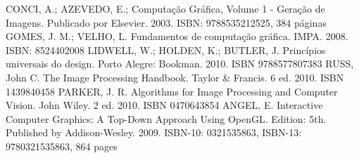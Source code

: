 {CONCI, A.; AZEVEDO, E.; Computação Gráfica, Volume 1 - Geração de
Imagens. Publicado por Elsevier. 2003. ISBN: 9788535212525, 384 páginas
\newline \newline 
GOMES, J. M.; VELHO, L. Fundamentos de computação gráfica. IMPA. 2008.
ISBN: 8524402008
\newline \newline 
LIDWELL, W.; HOLDEN, K.; BUTLER, J. Princípios universais do design. Porto
Alegre: Bookman. 2010. ISBN 9788577807383
\newline \newline 
RUSS, John C. The Image Processing Handbook. Taylor \& Francis. 6 ed.
2010. ISBN 1439840458
\newline \newline 
PARKER, J. R. Algorithms for Image Processing and Computer Vision. John
Wiley. 2 ed. 2010. ISBN 0470643854
\newline \newline 
ANGEL, E. Interactive Computer Graphics: A Top-Down Approach Using
OpenGL. Edition: 5th. Published by Addison-Wesley. 2009. ISBN-10:
0321535863, ISBN-13: 9780321535863, 864 pages
}


